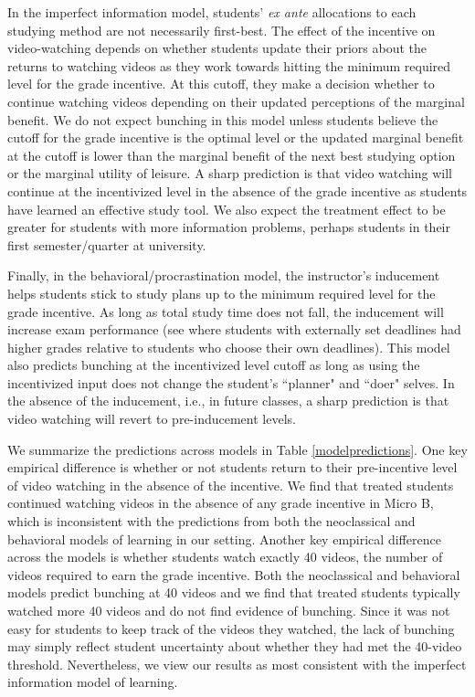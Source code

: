 \documentclass[12pt]{article}
\begin{document}
In the imperfect information model, students' \textit{ex ante} allocations to each studying method are not necessarily first-best. The effect of the incentive on video-watching depends on whether students update their priors about the returns to watching videos as they work towards hitting the minimum required level for the grade incentive. At this cutoff, they make a decision whether to continue watching videos depending on their updated perceptions of the marginal benefit. We do not expect bunching in this model unless students believe the cutoff for the grade incentive is the optimal level or the updated marginal benefit at the cutoff is lower than the marginal benefit of the next best studying option or the marginal utility of leisure. A sharp prediction is that video watching will continue at the incentivized level in the absence of the grade incentive as students have learned an effective study tool. We also expect the treatment effect to be greater for students with more information problems, perhaps students in their first semester/quarter at university.

Finally, in the behavioral/procrastination model, the instructor's inducement helps students stick to study plans up to the minimum required level for the grade incentive. As long as total study time does not fall, the inducement will increase exam performance (see \textcite{aw2002} where students with externally set deadlines had higher grades relative to students who choose their own deadlines). This model also predicts bunching at the incentivized level cutoff as long as using the incentivized input does not change the student's ``planner" and ``doer" selves. In the absence of the inducement, i.e., in future classes, a sharp prediction is that video watching will revert to pre-inducement levels.


We summarize the predictions across models in Table \ref{modelpredictions}. One key empirical difference is whether or not students return to their pre-incentive level of video watching in the absence of the incentive. We find that treated students continued watching videos in the absence of any grade incentive in Micro B, which is inconsistent with the predictions from both the neoclassical and behavioral models of learning in our setting. Another key empirical difference across the models is whether students watch exactly 40 videos, the number of videos required to earn the grade incentive. Both the neoclassical and behavioral models predict bunching at 40 videos and we find that treated students typically watched more 40 videos and do not find evidence of bunching. Since it was not easy for students to keep track of the videos they watched, the lack of bunching may simply reflect student uncertainty about whether they had met the 40-video threshold. Nevertheless, we view our results as most consistent with the imperfect information model of learning.
\end{document}
